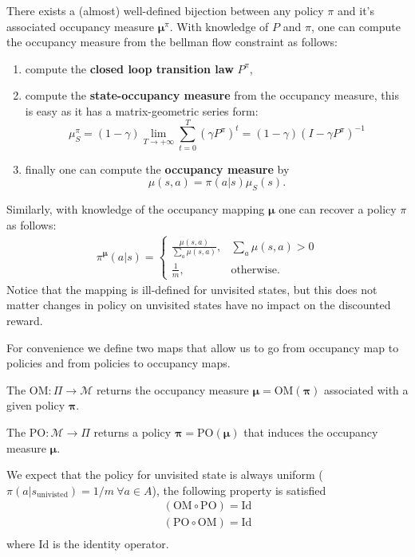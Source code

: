 \begin{observation}
    \label{obs:policy_occupancy_bijection}
    There exists a (almost) well-defined bijection between any policy $\pi$ and it's associated occupancy measure $\bm{\mu}^\pi$. With knowledge of $P$ and $\pi$, one can compute the occupancy measure from the bellman flow constraint as follows:
    \begin{enumerate}
        \item compute the \textbf{closed loop transition law} $P^\pi$,
        \item compute the \textbf{state-occupancy measure} from the occupancy measure, this is easy as it has a matrix-geometric series form:
        \[  \mu^\pi_S = (1-\gamma) \lim_{T \rightarrow + \infty} \sum_{t=0}^T  (\gamma P^\pi)^t = (1-\gamma) (I - \gamma P^\pi)^{-1} \]
        \item finally one can compute the \textbf{occupancy measure} by
        \[ \mu(s,a) = \pi(a|s)\mu_S(s).\]
    \end{enumerate}
    Similarly, with knowledge of the occupancy mapping $\bm{\mu}$ one can recover a policy $\pi$ as follows:
    \begin{align*}
        \pi^{\bm{\mu}}(a|s)= \begin{cases}
            \frac{\mu(s,a)}{\sum_a\mu(s,a)}, &  \sum_a \mu(s,a) > 0\\
            \frac{1}{m}, & \text{otherwise}.
        \end{cases}
    \end{align*}
    Notice that the mapping is ill-defined for unvisited states, but this does not matter changes in policy on unvisited states have no impact on the discounted reward.
\end{observation}

For convenience we define two maps that allow us to go from occupancy map to policies and from policies to occupancy maps.

\begin{definition}
    The $\text{OM}:\Pi \rightarrow \mathcal{M}$ returns the occupancy measure $\bm{\mu}=\text{OM}(\bm{\pi})$ associated with a given policy $\bm{\pi}$.
\end{definition}
\begin{definition}
    The $\text{PO}: \mathcal{M} \rightarrow \Pi$ returns a policy $\bm{\pi}=\text{PO}(\bm{\mu})$ that induces the occupancy measure $\bm{\mu}$.
\end{definition}

We expect that the policy for unvisited state is always uniform ($\pi(a|s_\text{univisted})=1/m~\forall a \in A$), the following property is satisfied
\begin{align*}
    (\text{OM} \circ \text{PO}) = \text{Id}\\
    (\text{PO} \circ \text{OM}) = \text{Id}\\
\end{align*}
where $\text{Id}$ is the identity operator.

